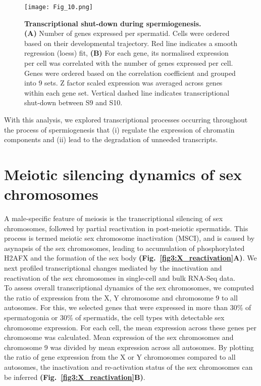 \begin{figure}[!h]
\centering
\texttt{[image: Fig\_10.png]}
\caption[Transcriptional shut-down during spermiogenesis]{\textbf{Transcriptional shut-down during spermiogenesis.} \\
\textbf{(A)} Number of genes expressed per spermatid. Cells were ordered based on their developmental trajectory. Red line indicates a smooth regression (loess) fit, \textbf{(B)} For each gene, its normalised expression per cell was correlated with the number of genes expressed per cell. Genes were ordered based on the correlation coefficient and grouped into 9 sets. Z factor scaled expression was averaged across genes within each gene set. Vertical dashed line indicates transcriptional shut-down between S9 and S10.}
\label{fig3:transcriptional_shutdown}
\end{figure}

With this analysis, we explored transcriptional processes occurring throughout the process of spermiogenesis that (i) regulate the expression of chromatin components and (ii) lead to the degradation of unneeded transcripts.

\newpage

\section{Meiotic silencing dynamics of sex chromosomes}

A male-specific feature of meiosis is the transcriptional silencing of sex chromosomes, followed by partial reactivation in post-meiotic spermatids. This process is termed meiotic sex chromosome inactivation (MSCI), and is caused by asynapsis of the sex chromosomes, leading to accumulation of phosphorylated H2AFX and the formation of the sex body \citep{Hamer2003} \textbf{(Fig.~\ref{fig3:X_reactivation}A)}. We next profiled transcriptional changes mediated by the inactivation and reactivation of the sex chromosomes in single-cell and bulk RNA-Seq data. \\

To assess overall transcriptional dynamics of the sex chromosomes, we computed the ratio of expression from the X, Y chromosome and chromosome 9 to all autosomes. For this, we selected genes that were expressed in more than 30\% of spermatogonia or 30\% of spermatids, the cell types with detectable sex chromosome expression. For each cell, the mean expression across these genes per chromosome was calculated. Mean expression of the sex chromosomes and chromosome 9 was divided by mean expression across all autosomes. By plotting the ratio of gene expression from the X or Y chromosomes compared to all autosomes, the inactivation and re-activation status of the sex chromosomes can be inferred \textbf{(Fig.~\ref{fig3:X_reactivation}B)}. \\

